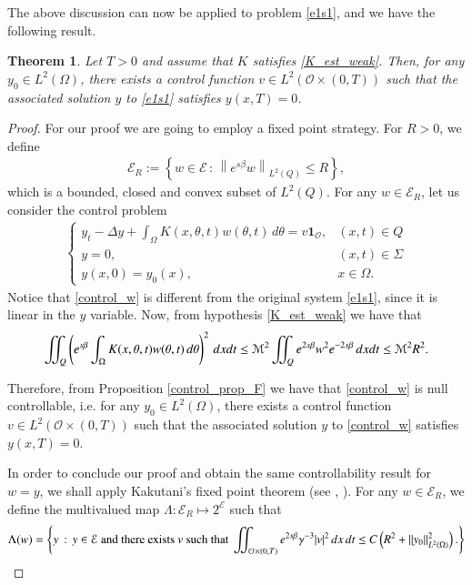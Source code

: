 \documentclass[preprint,1p]{elsarticle}
\newcommand{\D}{\displaystyle}
\newcommand{\norm}[2]{\left\|#1\right\|_{#2}}
\newcommand{\intd}{\displaystyle\int \kern -7pt \int}
\newtheorem{theorem}{\bf Theorem}[section]
\begin{document}
The above discussion can now be applied to problem \eqref{e1s1}, and we have the following result.
%
\begin{theorem}\label{control_thm2} 
Let $T>0$ and assume that $K$ satisfies \eqref{K_est_weak}. Then, for any $y_0\in L^2(\Omega)$, there exists a control function $v\in L^2(\mathcal O\times(0,T))$ such that the associated solution $y$ to \eqref{e1s1} satisfies $y(x,T) = 0$.	
\end{theorem}	
%
\begin{proof}
For our proof we are going to employ a fixed point strategy. For $R>0$, we define 
\begin{align*}
	\mathcal E_R:=\left\{ w\in\mathcal E\,:\, \norm{e^{s\beta}w}{L^2(Q)}\leq R\right\},
\end{align*}
which is a bounded, closed and convex subset of $L^2(Q)$. For any $w\in\mathcal E_R$, let us consider the control problem 
\begin{align}\label{control_w}
	\begin{cases}
		\D y_t - \Delta y + \int_\Omega K(x,\theta,t)w(\theta,t)\,d\theta = v\mathbf{1}_{\mathcal O}, & (x,t)\in Q
		\\
		y = 0, & (x,t)\in\Sigma
		\\
		y(x,0) = y_0(x), & x\in\Omega.
	\end{cases}
\end{align}	
Notice that \eqref{control_w} is different from the original system \eqref{e1s1}, since it is linear in the $y$ variable. Now, from hypothesis \eqref{K_est_weak} we have that
\begin{align*}
	\intd_Q\left(e^{s\beta}\int_\Omega K(x,\theta,t)w(\theta,t)\,d\theta\right)^2\,dxdt \leq \mathcal M^2\intd_Q e^{2s\beta}w^2e^{-2s\beta}\,dxdt \leq \mathcal M^2R^2.
\end{align*}

Therefore, from Proposition \ref{control_prop_F} we have that \eqref{control_w} is null controllable, i.e. for any $y_0\in L^2(\Omega)$, there exists a control function $v\in L^2(\mathcal O\times(0,T))$ such that the associated solution $y$ to \eqref{control_w} satisfies $y(x,T) = 0$. 

In order to conclude our proof and obtain the same controllability result for $w=y$, we shall apply Kakutani's fixed point theorem (see \cite[Theorem 2.3]{fernandez2006global}, \cite{kakutani1941generalization}). For any $w\in \mathcal E_R$, we define the multivalued map $\Lambda: \mathcal E_R\mapsto 2^{\mathcal E}$ such that
\begin{align*}
	\Lambda(w) = \left\{y\,:\,y\in\mathcal E \textrm{ and there exists } v \textrm{ such that }	\intd_{\mathcal O\times(0,T)} e^{2s\beta}\gamma^{-3} |v|^2\,dx\,dt \leq C \left(R^2 + \norm{y_0}{L^2(\Omega)}^2\right). \right\}
\end{align*} 	


\end{proof}
\end{document}

